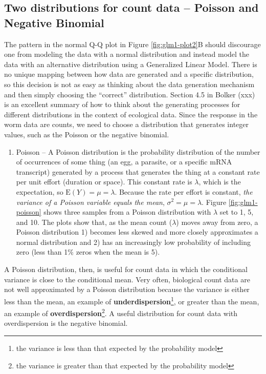 \documentclass[]{book}
\providecommand{\tightlist}{%
  \setlength{\itemsep}{0pt}\setlength{\parskip}{0pt}}
\let\rmarkdownfootnote\footnote%
\def\footnote{\protect\rmarkdownfootnote}
\begin{document}
\hypertarget{two-distributions-for-count-data-poisson-and-negative-binomial}{%
\subsection{Two distributions for count data -- Poisson and Negative Binomial}\label{two-distributions-for-count-data-poisson-and-negative-binomial}}

The pattern in the normal Q-Q plot in Figure \ref{fig:glm1-plot2}B should discourage one from modeling the data with a normal distribution and instead model the data with an alternative distribution using a Generalized Linear Model. There is no unique mapping between how data are generated and a specific distribution, so this decision is not as easy as thinking about the data generation mechanism and then simply choosing the ``correct'' distribution. Section 4.5 in Bolker (xxx) is an excellent summary of how to think about the generating processes for different distributions in the context of ecological data. Since the response in the worm data are counts, we need to choose a distribution that generates integer values, such as the Poisson or the negative binomial.

\begin{enumerate}
\def\labelenumi{\arabic{enumi}.}
\tightlist
\item
  Poisson -- A Poisson distribution is the probability distribution of the number of occurrences of some thing (an egg, a parasite, or a specific mRNA transcript) generated by a process that generates the thing at a constant rate per unit effort (duration or space). This constant rate is \(\lambda\), which is the expectation, so \(\mathrm{E}(Y) = \mu = \lambda\). Because the rate per effort is constant, \emph{the variance of a Poisson variable equals the mean}, \(\sigma^2 = \mu = \lambda\). Figure \ref{fig:glm1-poisson} shows three samples from a Poisson distribution with \(\lambda\) set to 1, 5, and 10. The plots show that, as the mean count (\(\lambda\)) moves away from zero, a Poisson distribution 1) becomes less skewed and more closely approximates a normal distribution and 2) has an increasingly low probability of including zero (less than 1\% zeros when the mean is 5).
\end{enumerate}

A Poisson distribution, then, is useful for count data in which the conditional variance is close to the conditional mean. Very often, biological count data are not well approximated by a Poisson distribution because the variance is either less than the mean, an example of \textbf{underdispersion}\footnote{the variance is less than that expected by the probability model}, or greater than the mean, an example of \textbf{overdispersion}\footnote{the variance is greater than that expected by the probability model}. A useful distribution for count data with overdispersion is the negative binomial.
\end{document}
